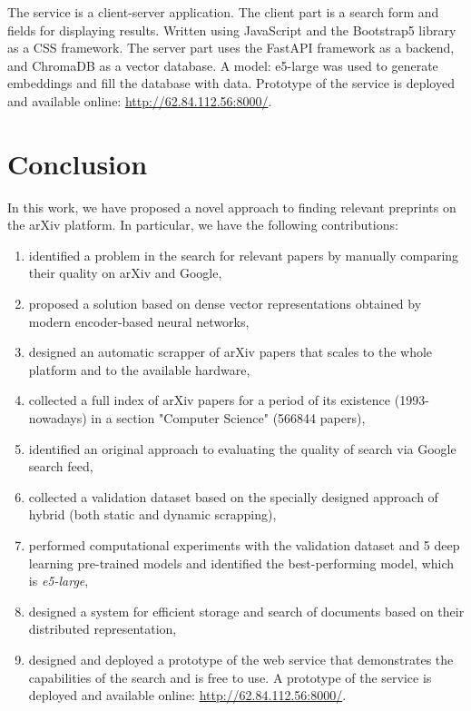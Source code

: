 \documentclass{article}
\begin{document}
        The service is a client-server application. The client part is a search form and fields for displaying results. Written using JavaScript and the Bootstrap5 library as a CSS framework. The server part uses the FastAPI framework as a backend, and ChromaDB as a vector database. A model: e5-large was used to generate embeddings and fill the database with data. Prototype of the service is deployed and available online: \url{http://62.84.112.56:8000/}.
        
    
    \section{Conclusion}
    
        In this work, we have proposed a novel approach to finding relevant preprints on the arXiv platform. In particular, we have the following contributions:
        
        \begin{enumerate}
            \item identified a problem in the search for relevant papers by manually comparing their quality on arXiv and Google,
            \item proposed a solution based on dense vector representations obtained by modern encoder-based neural networks,
            \item designed an automatic scrapper of arXiv papers that scales to the whole platform and to the available hardware,
            \item collected a full index of arXiv papers for a period of its existence (1993-nowadays) in a section "Computer Science" (566844 papers),
            \item identified an original approach to evaluating the quality of search via Google search feed,
            \item collected a validation dataset based on the specially designed approach of hybrid (both static and dynamic scrapping),
            \item performed computational experiments with the validation dataset and 5 deep learning pre-trained models and identified the best-performing model, which is \textit{e5-large},
            \item designed a system for efficient storage and search of documents based on their distributed representation,
            \item designed and deployed a prototype of the web service that demonstrates the capabilities of the search and is free to use. A prototype of the service is deployed and available online: \url{http://62.84.112.56:8000/}.
        \end{enumerate}
        
\end{document}
